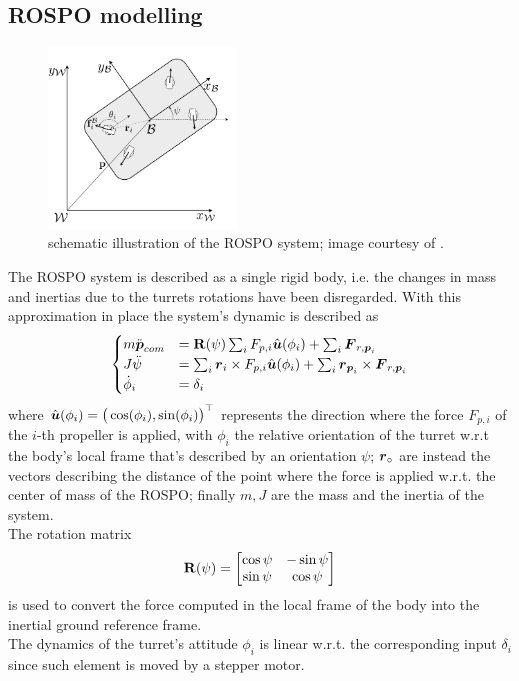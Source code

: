 \subsection{ROSPO modelling}
\begin{figure}[bt]
    \centering
    \includegraphics[width=5cm]{Images/rospo-scheme}
    \caption{schematic illustration of the ROSPO system; image courtesy of \cite{rospo}.}
    \label{fig:scheme}
\end{figure}
The ROSPO system is described as a single rigid body, i.e. the changes in mass and inertias due to the turrets rotations have been disregarded.
With this approximation in place the system's dynamic is described as
\begin{equation} \label{eq:dynamics}
\begin{cases}
    m \ddvett p_{com} & = \matt R(\psi)\sum_{i} F_{p,i} \vers u(\phi_{i}) + \sum_{i} \vett F_{r, \vett p_{i}} \\
    J \ddot \psi & = \sum_{i} \vett r_{i} \times F_{p,i} \vers u(\phi_{i}) + \sum_{i} \vett r_{\vett p_{i}} \times \vett F_{r, \vett p_{i}} \\
    \dot \phi_{i} & = \delta_{i}
\end{cases}
\end{equation}
where $\hat{\boldsymbol{u}}(\phi_{i}) = \big(\cos(\phi_{i}), \sin(\phi_{i})\big)^{\top}$ represents the direction where the force $F_{p,i}$ of the $i$-th propeller is applied, with $\phi_{i}$ the relative orientation of the turret w.r.t the body's local frame that's described by an orientation $\psi$; $\boldsymbol{r}_{\circ}$ are instead the vectors describing the distance of the point where the force is applied w.r.t. the center of mass of the ROSPO; finally $m,J$ are the mass and the inertia of the system. \\
The rotation matrix \[ \mathbf{R}(\psi) = \begin{bmatrix} \cos \psi & -\sin\psi \\ \sin\psi & \cos\psi \end{bmatrix} \]
is used to convert the force computed in the local frame of the body into the inertial ground reference frame. \\
The dynamics of the turret's attitude $\phi_{i}$ is linear w.r.t. the corresponding input $\delta_{i}$ since such element is moved by a stepper motor.

